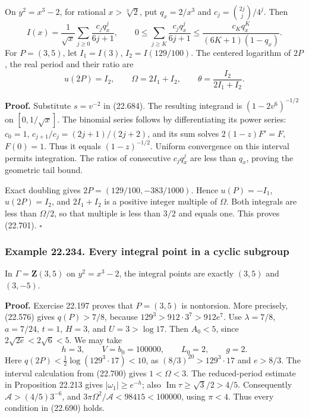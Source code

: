 \documentclass[
  11pt,
  a4paper,
]{article}
\begin{document}
On \(y^2=x^3-2\), for rational \(x>\sqrt[3]2\), put \(q_x=2/x^3\) and
\(c_j=\binom{2j}{j}/4^j\). Then \[
 I(x)=\frac1{\sqrt x}\sum_{j\ge0}
                   \frac{c_jq_x^j}{6j+1},\qquad
 0\le\sum_{j\ge K}\frac{c_jq_x^j}{6j+1}
 \le\frac{c_Kq_x^K}{(6K+1)(1-q_x)}.
 \tag{22.700}
\] For \(P=(3,5)\), let \(I_1=I(3)\), \(I_2=I(129/100)\). The centered
logarithm of \(2P\), the real period and their ratio are \[
 u(2P)=I_2,\qquad \Omega=2I_1+I_2,\qquad
 \theta=\frac{I_2}{2I_1+I_2}.
 \tag{22.701}
\]

\textbf{Proof.} Substitute \(s=v^{-2}\) in (22.684). The resulting
integrand is \((1-2v^6)^{-1/2}\) on \([0,1/\sqrt x]\). The binomial
series follows by differentiating its power series: \(c_0=1\),
\(c_{j+1}/c_j=(2j+1)/(2j+2)\), and its sum solves \(2(1-z)F'=F\),
\(F(0)=1\). Thus it equals \((1-z)^{-1/2}\). Uniform convergence on this
interval permits integration. The ratios of consecutive \(c_jq_x^j\) are
less than \(q_x\), proving the geometric tail bound.

Exact doubling gives \(2P=(129/100,-383/1000)\). Hence \(u(P)=-I_1\),
\(u(2P)=I_2\), and \(2I_1+I_2\) is a positive integer multiple of
\(\Omega\). Both integrals are less than \(\Omega/2\), so that multiple
is less than \(3/2\) and equals one. This proves (22.701). \(\square\)

\subsubsection{Example 22.234. Every integral point in a cyclic
subgroup}\label{example-22.234.-every-integral-point-in-a-cyclic-subgroup}

In \(\Gamma=\mathbf Z(3,5)\) on \(y^2=x^3-2\), the integral points are
exactly \((3,5)\) and \((3,-5)\).

\textbf{Proof.} Exercise 22.197 proves that \(P=(3,5)\) is nontorsion.
More precisely, (22.576) gives \(q(P)>7/8\), because
\(129^3>912\cdot3^7>912e^7\). Use \(\lambda=7/8\), \(a=7/24\), \(t=1\),
\(H=3\), and \(U=3>\log17\). Then \(A_0<5\), since
\(2\sqrt{2e}<2\sqrt6<5\). We may take \[
 h=3,\qquad V=b_0=100000,\qquad L_0=2,\qquad g=2.
 \tag{22.702}
\] Here \(q(2P)<\tfrac12\log(129^3\cdot17)<10\), as
\((8/3)^{20}>129^3\cdot17\) and \(e>8/3\). The interval calculation from
(22.700) gives \(1<\Omega<3\). The reduced-period estimate in
Proposition 22.213 gives \(|\omega_1|\ge e^{-h}\); also
\(\operatorname{Im}\tau\ge\sqrt3/2>4/5\). Consequently
\(\mathcal A>(4/5)3^{-6}\), and
\(3\pi\Omega^2/\mathcal A<98415<100000\), using \(\pi<4\). Thus every
condition in (22.690) holds.
\end{document}
